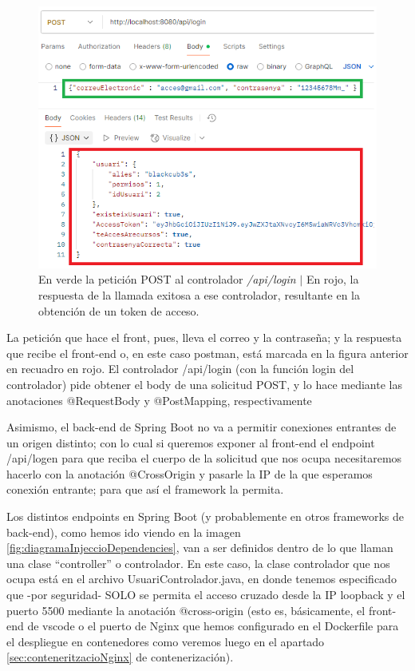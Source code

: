 \documentclass[a4paper,12pt]{report}
\begin{document}
				
				\FloatBarrier
				\begin{figure}[H]
					\centering
					\caption{En verde la petición POST al controlador \textit{/api/login} $|$ En rojo, la respuesta de la llamada exitosa a ese controlador, resultante en la obtención de un token de acceso.}
					\includegraphics[width=1\linewidth]{img/apiLoginSpringBoot}

					\label{fig:apiloginspringboot}
				\end{figure}
				\FloatBarrier

				La petición que hace el front, pues, lleva el correo y la contraseña; y la respuesta que recibe el front-end o, en este caso postman, está marcada en la figura anterior en recuadro en rojo. El controlador /api/login (con la función login del controlador) pide obtener el body de una solicitud POST, y lo hace mediante las anotaciones @RequestBody y @PostMapping, respectivamente
				
				Asimismo, el back-end de Spring Boot no va a permitir conexiones entrantes de un origen distinto; con lo cual si queremos exponer al front-end el endpoint /api/logen para que reciba el cuerpo de la solicitud que nos ocupa necesitaremos hacerlo con la anotación @CrossOrigin y pasarle la IP de la que esperamos conexión entrante; para que así el framework la permita. 
				
				Los distintos endpoints en Spring Boot (y probablemente en otros frameworks de back-end), como hemos ido viendo en la imagen \ref{fig:diagramaInjeccioDependencies}, van a ser definidos dentro de lo que llaman una clase ``controller'' o controlador. En este caso, la clase controlador que nos ocupa está en el archivo UsuariControlador.java, en donde tenemos especificado que -por seguridad- SOLO se permita el acceso cruzado desde la IP loopback y el puerto 5500 mediante la anotación @cross-origin (esto es, básicamente, el front-end de vscode o el puerto de Nginx que hemos configurado en el Dockerfile para el despliegue en contenedores como veremos luego en el apartado \ref{sec:conteneritzacioNginx} de contenerización).
				
\end{document}
